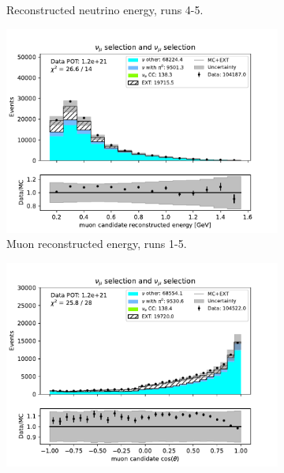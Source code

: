 \begin{figure}[H]
\begin{subfigure}{0.33\linewidth}
        \caption{Reconstructed neutrino energy, runs 4-5.}
    \end{subfigure}    
    \begin{subfigure}{0.33\linewidth}
        \captionsetup{width=0.7\linewidth}
        \includegraphics[width=\linewidth]{technote/Sidebands/Figures/NuMuSideband/muon_sideband_muon_energy_run1234a4b4c4d5_NUMU_NUMU.pdf}
        \caption{Muon reconstructed energy, runs 1-5.}
    \end{subfigure}%
    \begin{subfigure}{0.33\linewidth}
        \captionsetup{width=0.6\linewidth}
        \includegraphics[width=\linewidth]{technote/Sidebands/Figures/NuMuSideband/muon_sideband_muon_theta_run1234a4b4c4d5_NUMU_NUMU.pdf}

\end{subfigure}
\end{figure}
